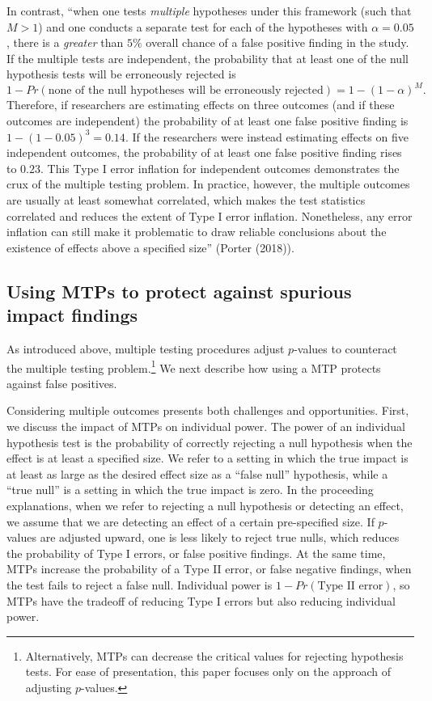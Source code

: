 \documentclass{article}
\begin{document}
In contrast, ``when one tests \emph{multiple} hypotheses under this
framework (such that \(M>1\)) and one conducts a separate test for each
of the hypotheses with \(\alpha=0.05\), there is a \emph{greater} than
\(5\%\) overall chance of a false positive finding in the study. If the
multiple tests are independent, the probability that at least one of the
null hypothesis tests will be erroneously rejected is
\[1-Pr(\text{none of the null hypotheses will be erroneously rejected}) = 1-(1-\alpha)^M.\]
Therefore, if researchers are estimating effects on three outcomes (and
if these outcomes are independent) the probability of at least one false
positive finding is \(1-(1-0.05)^3=0.14\). If the researchers were
instead estimating effects on five independent outcomes, the probability
of at least one false positive finding rises to \(0.23\). This Type I
error inflation for independent outcomes demonstrates the crux of the
multiple testing problem. In practice, however, the multiple outcomes
are usually at least somewhat correlated, which makes the test
statistics correlated and reduces the extent of Type I error inflation.
Nonetheless, any error inflation can still make it problematic to draw
reliable conclusions about the existence of effects above a specified
size'' (Porter (2018)).

\subsection{Using MTPs to protect against spurious impact findings}
\label{sec:mtp_use}

As introduced above, multiple testing procedures adjust \(p\)-values to
counteract the multiple testing problem.\footnote{Alternatively, MTPs
  can decrease the critical values for rejecting hypothesis tests. For
  ease of presentation, this paper focuses only on the approach of
  adjusting \(p\)-values.} We next describe how using a MTP protects
against false positives.

Considering multiple outcomes presents both challenges and
opportunities. First, we discuss the impact of MTPs on individual power.
The power of an individual hypothesis test is the probability of
correctly rejecting a null hypothesis when the effect is at least a
specified size. We refer to a setting in which the true impact is at
least as large as the desired effect size as a ``false null''
hypothesis, while a ``true null'' is a setting in which the true impact
is zero. In the proceeding explanations, when we refer to rejecting a
null hypothesis or detecting an effect, we assume that we are detecting
an effect of a certain pre-specified size. If \(p\)-values are adjusted
upward, one is less likely to reject true nulls, which reduces the
probability of Type I errors, or false positive findings. At the same
time, MTPs increase the probability of a Type II error, or false
negative findings, when the test fails to reject a false null.
Individual power is \(1 - Pr(\text{Type II error})\), so MTPs have the
tradeoff of reducing Type I errors but also reducing individual power.
\end{document}
